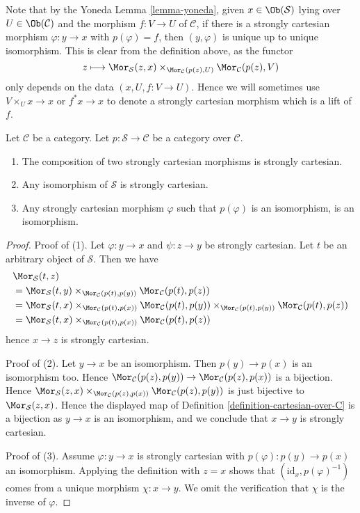 \noindent
Note that by the Yoneda Lemma \ref{lemma-yoneda}, given
$x \in \Ob(\mathcal{S})$ lying over $U \in \Ob(\mathcal{C})$
and the morphism $f : V \to U$ of $\mathcal{C}$, if there is a
strongly cartesian morphism $\varphi : y \to x$ with $p(\varphi) = f$,
then $(y, \varphi)$ is unique up to unique isomorphism. This is
clear from the definition above, as the functor
$$
z
\longmapsto
\Mor_\mathcal{S}(z, x)
\times_{\Mor_\mathcal{C}(p(z), U)}
\Mor_\mathcal{C}(p(z), V)
$$
only depends on the data $(x, U, f : V \to U)$. Hence we
will sometimes use $V \times_U x \to x$ or $f^*x \to x$
to denote a strongly cartesian morphism which is a lift of $f$.

\begin{lemma}
\label{lemma-composition-cartesian}
Let $\mathcal{C}$ be a category.
Let $p : \mathcal{S} \to \mathcal{C}$ be a category over $\mathcal{C}$.
\begin{enumerate}
\item The composition of two strongly cartesian morphisms
is strongly cartesian.
\item Any isomorphism of $\mathcal{S}$ is strongly cartesian.
\item Any strongly cartesian morphism $\varphi$ such that $p(\varphi)$
is an isomorphism, is an isomorphism.
\end{enumerate}
\end{lemma}

\begin{proof}
Proof of (1). Let $\varphi : y \to x$ and $\psi : z \to y$ be
strongly cartesian. Let $t$ be an arbitrary object of $\mathcal{S}$.
Then we have
\begin{align*}
& \Mor_\mathcal{S}(t, z) \\
& =
\Mor_\mathcal{S}(t, y)
\times_{\Mor_\mathcal{C}(p(t), p(y))}
\Mor_\mathcal{C}(p(t), p(z)) \\
& =
\Mor_\mathcal{S}(t, x)
\times_{\Mor_\mathcal{C}(p(t), p(x))}
\Mor_\mathcal{C}(p(t), p(y))
\times_{\Mor_\mathcal{C}(p(t), p(y))}
\Mor_\mathcal{C}(p(t), p(z)) \\
& =
\Mor_\mathcal{S}(t, x)
\times_{\Mor_\mathcal{C}(p(t), p(x))}
\Mor_\mathcal{C}(p(t), p(z))
\end{align*}
hence $x \to z$ is strongly cartesian.

\medskip\noindent
Proof of (2). Let $y \to x$ be an isomorphism. Then $p(y) \to p(x)$
is an isomorphism too. Hence
$\Mor_\mathcal{C}(p(z), p(y)) \to
\Mor_\mathcal{C}(p(z), p(x))$
is a bijection. Hence
$\Mor_\mathcal{S}(z, x)
\times_{\Mor_\mathcal{C}(p(z), p(x))}
\Mor_\mathcal{C}(p(z), p(y))$ is just bijective to
$\Mor_\mathcal{S}(z, x)$.
Hence the displayed map of
Definition \ref{definition-cartesian-over-C}
is a bijection as $y \to x$ is an isomorphism, and we conclude that
$x \to y$ is strongly cartesian.

\medskip\noindent
Proof of (3). Assume $\varphi : y \to x$ is strongly cartesian with
$p(\varphi) : p(y) \to p(x)$ an isomorphism. Applying the definition with
$z = x$ shows that $(\text{id}_x, p(\varphi)^{-1})$ comes from a unique
morphism $\chi : x \to y$. We omit the verification that $\chi$ is the
inverse of $\varphi$.
\end{proof}


